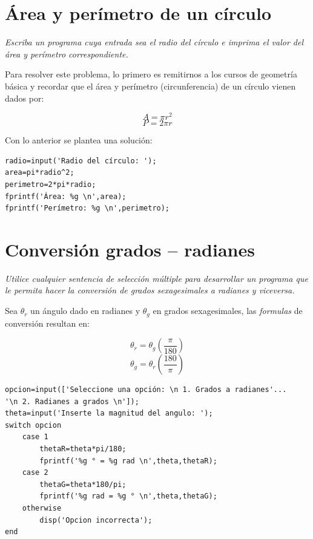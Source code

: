 
\section{Área y perímetro de un círculo}

\textit{Escriba un programa cuya entrada sea el radio del círculo e imprima el valor del área y 
perímetro correspondiente.}



Para resolver este problema, lo primero es remitirnos a los cursos de geometría básica y recordar 
que el área y perímetro (circunferencia) de un círculo vienen dados por:

$$A=\pi r^2$$
$$P=2 \pi r$$

Con lo anterior se plantea una solución:

\begin{verbatim}
radio=input('Radio del círculo: ');
area=pi*radio^2;
perimetro=2*pi*radio;
fprintf('Área: %g \n',area);
fprintf('Perímetro: %g \n',perimetro);
\end{verbatim}


\section{Conversión grados – radianes}

\textit{Utilice cualquier sentencia de selección múltiple para desarrollar un programa que le permita hacer la conversión de grados sexagesimales a radianes y viceversa.}



Sea $\theta_r$ un ángulo dado en radianes y $\theta_g$ en grados sexagesimales, las {\it formulas} de 
conversión resultan en:

$$\theta_r = \theta_g \left(\frac{\pi}{180}\right)$$
$$\theta_g = \theta_r \left(\frac{180}{\pi}\right)$$

\begin{verbatim}
opcion=input(['Seleccione una opción: \n 1. Grados a radianes'...
'\n 2. Radianes a grados \n']);
theta=input('Inserte la magnitud del angulo: ');
switch opcion
    case 1
        thetaR=theta*pi/180;
        fprintf('%g ° = %g rad \n',theta,thetaR);
    case 2
        thetaG=theta*180/pi;
        fprintf('%g rad = %g ° \n',theta,thetaG);
    otherwise
        disp('Opcion incorrecta');
end
\end{verbatim}


